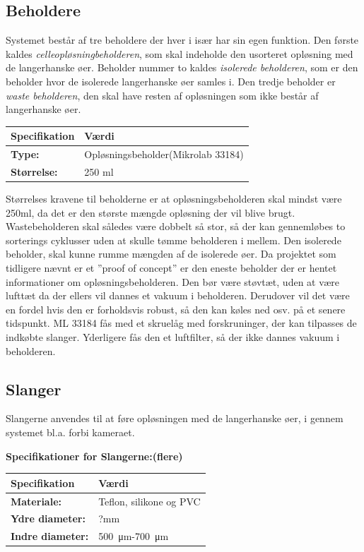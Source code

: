 \subsection{Beholdere}
Systemet består af tre beholdere der hver i især har sin egen funktion. Den første kaldes \textit{celleopløsningbeholderen}, som skal indeholde den usorteret opløsning med de langerhanske øer. Beholder nummer to kaldes \textit{isolerede beholderen}, som er den beholder hvor de isolerede langerhanske øer samles i. Den tredje beholder er \textit{waste beholderen}, den skal have resten af opløsningen som ikke består af langerhanske øer.
\begin{center}
		\begin{longtable}{ | m{6.5cm} | m{6.5cm}| } 
			\hline
			\textbf{Specifikation} &\textbf{Værdi} \\ 
			\hline
			\textbf{Type:} & Opløsningsbeholder(Mikrolab 33184) \\ 
			\hline
			\textbf{Størrelse:} & 250 ml \\ 
			\hline
		\end{longtable}
\end{center}
Størrelses kravene til beholderne er at opløsningsbeholderen skal mindst være 250ml, da det er den største mængde opløsning der vil blive brugt. Wastebeholderen skal således være dobbelt så stor, så der kan gennemløbes to sorterings cyklusser uden at skulle tømme beholderen i mellem. Den isolerede beholder, skal kunne rumme mængden af de isolerede øer. Da projektet som tidligere nævnt er et ”proof of concept” er den eneste beholder der er hentet informationer om opløsningsbeholderen. Den bør være støvtæt, uden at være lufttæt da der ellers vil dannes et vakuum i beholderen. Derudover vil det være en fordel hvis den er forholdsvis robust, så den kan køles ned osv. på et senere tidspunkt. ML 33184 fås med et skruelåg med forskruninger, der kan tilpasses de indkøbte slanger. Yderligere fås den et luftfilter, så der ikke dannes vakuum i beholderen.

\subsection{Slanger}
Slangerne anvendes til at føre opløsningen med de langerhanske øer, i gennem systemet bl.a. forbi kameraet.

\textbf{Specifikationer for Slangerne:(flere)} 
\begin{center}
		\begin{longtable}{ | m{6.5cm} | m{6.5cm}| } 
			\hline
			\textbf{Specifikation} &\textbf{Værdi} \\ 
			\hline
			\textbf{Materiale:} & Teflon, silikone og PVC \\ 
			\hline
			\textbf{Ydre diameter:} & ?mm  \\ 
			\hline
			\textbf{Indre diameter:} & \SI{500}{\micro\metre}-\SI{700}{\micro\metre}  \\ 
			\hline			
		\end{longtable}
\end{center}

